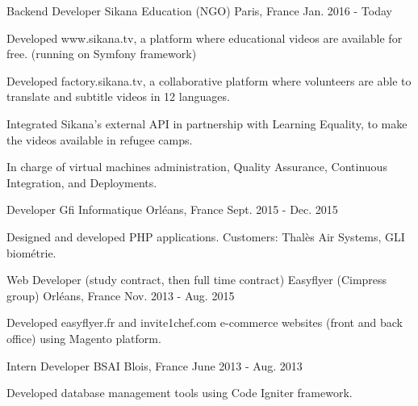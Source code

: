 \begin{cventries}
  \cventry
    {Backend Developer}
    {Sikana Education (NGO)}
    {Paris, France}
    {Jan. 2016 - Today}
    {
      \begin{cvitems}
        \item {Developed www.sikana.tv, a platform where educational videos are available for free. (running on Symfony framework)}
        \item {Developed factory.sikana.tv, a collaborative platform where volunteers are able to translate and subtitle videos in 12 languages.}
        \item {Integrated Sikana's external API in partnership with Learning Equality, to make the videos available in refugee camps.}
        \item {In charge of virtual machines administration, Quality Assurance, Continuous Integration, and Deployments.}
      \end{cvitems}
    }
  \cventry
    {Developer}
    {Gfi Informatique}
    {Orléans, France}
    {Sept. 2015 - Dec. 2015}
    {
      \begin{cvitems}
        \item {Designed and developed PHP applications. Customers: Thalès Air Systems, GLI biométrie.}
      \end{cvitems}
    }
  \cventry
    {Web Developer (study contract, then full time contract)}
    {Easyflyer (Cimpress group)}
    {Orléans, France}
    {Nov. 2013 - Aug. 2015}
    {
      \begin{cvitems}
        \item {Developed easyflyer.fr and invite1chef.com e-commerce websites (front and back office) using Magento platform.}
      \end{cvitems}
    }
  \cventry
    {Intern Developer}
    {BSAI}
    {Blois, France}
    {June 2013 - Aug. 2013}
    {
      \begin{cvitems}
        \item {Developed database management tools using Code Igniter framework.}
      \end{cvitems}
    }
\end{cventries}
